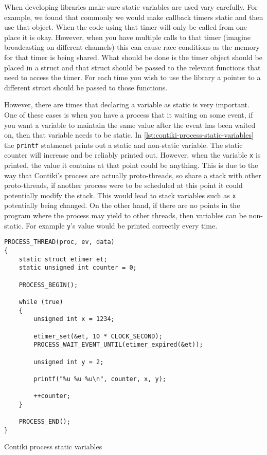 When developing libraries make sure static variables are used vary carefully. For example, we found that commonly we would make callback timers static and then use that object. When the code using that timer will only be called from one place it is okay. However, when you have multiple calls to that timer (imagine broadcasting on different channels) this can cause race conditions as the memory for that timer is being shared. What should be done is the timer object should be placed in a struct and that struct should be passed to the relevant functions that need to access the timer. For each time you wish to use the library a pointer to a different struct should be passed to those functions.

However, there are times that declaring a variable as static is very important. One of these cases is when you have a process that it waiting on some event, if you want a variable to maintain the same value after the event has been waited on, then that variable needs to be static. In \autoref{lst:contiki-process-static-variables} the \verb|printf| statmenet prints out a static and non-static variable. The static counter will increase and be reliably printed out. However, when the variable \verb|x| is printed, the value it contains at that point could be anything. This is due to the way that Contiki's process are actually proto-threads, so share a stack with other proto-threads, if another process were to be scheduled at this point it could potentially modify the stack. This would lead to stack variables such as \verb|x| potentially being changed. On the other hand, if there are no points in the program where the process may yield to other threads, then variables can be non-static. For example \verb|y|'s value would be printed correctly every time.

\begin{listing}[H]
\begin{verbatim}
PROCESS_THREAD(proc, ev, data)
{
	static struct etimer et;
	static unsigned int counter = 0;

	PROCESS_BEGIN();

	while (true)
	{
		unsigned int x = 1234;

		etimer_set(&et, 10 * CLOCK_SECOND);
		PROCESS_WAIT_EVENT_UNTIL(etimer_expired(&et));

		unsigned int y = 2;

		printf("%u %u %u\n", counter, x, y);

		++counter;
	}

	PROCESS_END();
}
\end{verbatim}
\caption{Contiki process static variables}
\label{lst:contiki-process-static-variables}
\end{listing}

